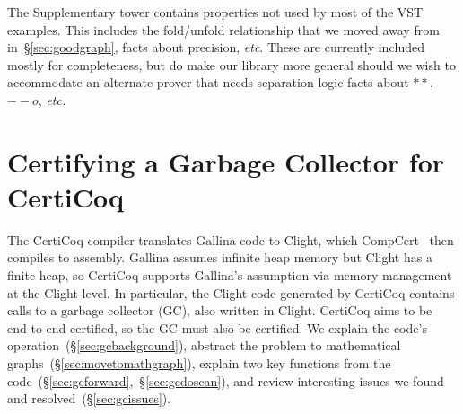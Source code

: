 \documentclass[acmsmall,screen]{acmart}
\newcommand\hide[1]{}
\newcommand{\p}[1]{\ensuremath{\mathsf{#1}}} \newcommand{\m}[1]{\ensuremath{\mathit{#1}}} \newcommand{\ma}[1]{\ensuremath{\mathcal{#1}}} \let\ramify\lightning
\begin{document}
\hide{Taking the marking algorithm we introduced in \S\ref{sec:orientation} as an example, we prove the following theorem from the library:
{\color{red}
\begin{equation*}
\label{lem:updatesubgraph}
\frac
{n \in \p{neighbors}(\gamma,x)}
{
\p{graph}(x, \gamma) |- \p{graph}(n, \gamma) \! * \!
\forall \gamma'. \m{mark}(\gamma, n, \gamma') -> \big(\p{graph}(n, \gamma') \! --* \! \p{graph}(x, \gamma')\big)
}
\end{equation*}
}
}

The Supplementary tower contains properties not used by most of the VST examples.
This includes the fold/unfold relationship that we moved away from 
in~\S\ref{sec:goodgraph}, facts
about precision, \emph{etc}. These are currently included mostly for completeness,
but do make our library more general should we wish to accommodate an alternate
prover that needs separation logic facts about $**$,  $--o$, \emph{etc.}










 
\section{Certifying a Garbage Collector for CertiCoq}
\label{sec:certigc}


\hide{The GC is our most complicated example,
and we will discuss some of its key proofs, but the larger
point here is that we completed this certification using
exactly the framework and principles we have discussed
thus far.

We enjoyed significant code
reuse from our prior certifications, and when we stated
new lemmas for the GC, we filed them away at the appropriate
``layers'' so that they may be reused in the future.
}


The CertiCoq compiler \cite{certicoqpaper} translates Gallina code to
Clight, which CompCert~\cite{leroy:compcert} then compiles to assembly.
Gallina assumes infinite heap memory but Clight has a 
finite heap, so
CertiCoq supports Gallina's assumption via 
memory management at the Clight level.
In particular, the Clight code generated by CertiCoq contains 
calls to a garbage collector (GC), also written in Clight. 
CertiCoq aims to be end-to-end certified, so the GC must also be certified.
We explain the code's operation~(\S\ref{sec:gcbackground}), 
abstract the problem to mathematical graphs~(\S\ref{sec:movetomathgraph}),
explain two key functions from the code~(\S\ref{sec:gcforward},~\S\ref{sec:gcdoscan}),
and review interesting issues we found and resolved~(\S\ref{sec:gcissues}).
\end{document}
